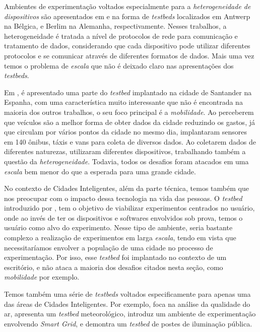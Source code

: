 Ambientes de experimentação voltados especialmente para a \textit{heterogeneidade de dispositivos} são apresentados em \cite{latre_2016} e \cite{juraschek_2012} na forma de \textit{testbeds} localizados
em Antwerp na Bélgica, e Berlim na Alemanha, respectivamente.
Nesses trabalhos, a heterogeneidade é tratada a nível de protocolos de rede para comunicação e tratamento de dados, considerando que cada dispositivo pode utilizar diferentes protocolos e se comunicar
através de diferentes formatos de dados.
Mais uma vez temos o problema de \textit{escala} que não é deixado claro nas apresentações dos \textit{testbeds}.

Em \cite{lanza_2015}, é apresentado uma parte do \textit{testbed} implantado na cidade de Santander na Espanha, com uma característica muito interessante que não é encontrada na maioria dos outros
trabalhos, o seu foco principal é a \textit{mobilidade}.
Ao perceberem que veículos são a melhor forma de obter dados da cidade reduzindo os gastos, já que circulam por vários pontos da cidade no mesmo dia, implantaram sensores em 140 ônibus, táxis e vans
para coleta de diversos dados.
Ao coletarem dados de diferentes naturezas, utilizaram diferentes dispositivos, trabalhando também a questão da \textit{heterogeneidade}.
Todavia, todos os desafios foram atacados em uma \textit{escala} bem menor do que a esperada para uma grande cidade.

No contexto de Cidades Inteligentes, além da parte técnica, temos também que nos preocupar com o impacto dessa tecnologia na vida das pessoas.
O \textit{testbed} introduzido por \cite{nati_2013}, tem o objetivo de viabilizar experimentos centrados no usuário, onde ao invés de ter os dispositivos e softwares envolvidos sob prova, temos
o usuário como alvo do experimento.
Nesse tipo de ambiente, seria bastante complexo a realização de experimentos em larga \textit{escala}, tendo em vista que necessitaríamos envolver a população de uma cidade no processo de
experimentação.
Por isso, esse \textit{testbed} foi implantado no contexto de um escritório, e não ataca a maioria dos desafios citados nesta seção, como \textit{mobilidade} por exemplo.

Temos também uma série de \textit{testbeds} voltados especificamente para apenas uma das áreas de Cidades Inteligentes.
Por exemplo, \cite{braem_2016} foca na análise da qualidade do ar, \cite{lee_2015} apresenta um \textit{testbed} meteorológico, \cite{lu_2010} introduz um ambiente de experimentação envolvendo
\textit{Smart Grid}, e \cite{amrutur_2017} demontra um \textit{testbed} de postes de iluminação pública.

